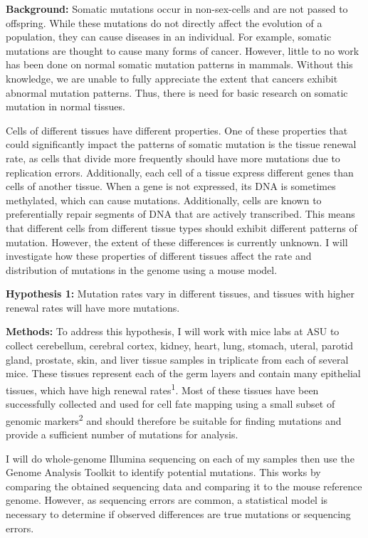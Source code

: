 \documentclass[12pt]{article}
\begin{document}
\noindent
\textbf{Background:}
Somatic mutations occur in non-sex-cells and are not passed to offspring.
While these mutations do not directly affect the evolution of a population, they can cause diseases in an individual.
For example, somatic mutations are thought to cause many forms of cancer.
However, little to no work has been done on normal somatic mutation patterns in mammals.
Without this knowledge, we are unable to fully appreciate the extent that cancers exhibit abnormal mutation patterns.
Thus, there is need for basic research on somatic mutation in normal tissues.

Cells of different tissues have different properties.
One of these properties that could significantly impact the patterns of somatic mutation is the tissue renewal rate, as cells that divide more frequently should have more mutations due to replication errors.
Additionally, each cell of a tissue express different genes than cells of another tissue.
When a gene is not expressed, its DNA is sometimes methylated, which can cause mutations.
Additionally, cells are known to preferentially repair segments of DNA that are actively transcribed.
This means that different cells from different tissue types should exhibit different patterns of mutation.
However, the extent of these differences is currently unknown.
I will investigate how these properties of different tissues affect the rate and distribution of mutations in the genome using a mouse model.

\textbf{Hypothesis 1:}
Mutation rates vary in different tissues, and tissues with higher renewal rates will have more mutations.

\textbf{Methods:}
To address this hypothesis, I will work with mice labs at ASU to collect cerebellum, cerebral cortex, kidney, heart, lung, stomach, uteral, parotid gland, prostate, skin, and liver tissue samples in triplicate from each of several mice.
These tissues represent each of the germ layers and contain many epithelial tissues, which have high renewal rates\textsuperscript{1}.
Most of these tissues have been successfully collected and used for cell fate mapping using a small subset of genomic markers\textsuperscript{2} and should therefore be suitable for finding mutations and provide a sufficient number of mutations for analysis.

I will do whole-genome Illumina sequencing on each of my samples then use the Genome Analysis Toolkit to identify potential mutations.
This works by comparing the obtained sequencing data and comparing it to the mouse reference genome.
However, as sequencing errors are common, a statistical model is necessary to determine if observed differences are true mutations or sequencing errors.
\end{document}
